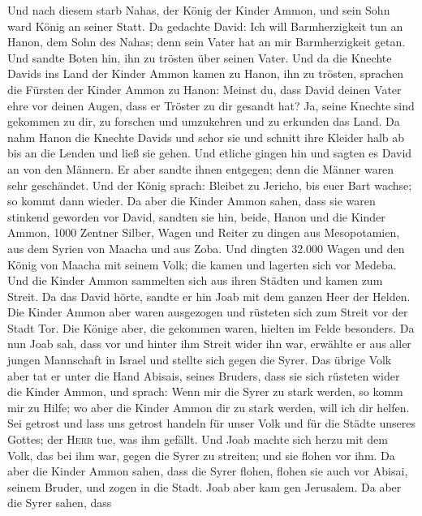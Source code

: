  Und nach diesem starb Nahas, der König der Kinder Ammon,
und sein Sohn ward König an seiner Statt.  Da gedachte
David: Ich will Barmherzigkeit tun an Hanon, dem Sohn des Nahas; denn
sein Vater hat an mir Barmherzigkeit getan. Und sandte Boten hin, ihn zu
trösten über seinen Vater. Und da die Knechte Davids ins Land der Kinder
Ammon kamen zu Hanon, ihn zu trösten,  sprachen die
Fürsten der Kinder Ammon zu Hanon: Meinst du, dass David deinen Vater
ehre vor deinen Augen, dass er Tröster zu dir gesandt hat? Ja, seine
Knechte sind gekommen zu dir, zu forschen und umzukehren und zu erkunden
das Land.  Da nahm Hanon die Knechte Davids und schor sie
und schnitt ihre Kleider halb ab bis an die Lenden und ließ sie gehen.
 Und etliche gingen hin und sagten es David an von den
Männern. Er aber sandte ihnen entgegen; denn die Männer waren sehr
geschändet. Und der König sprach: Bleibet zu Jericho, bis euer Bart
wachse; so kommt dann wieder.  Da aber die Kinder Ammon
sahen, dass sie waren stinkend geworden vor David, sandten sie hin,
beide, Hanon und die Kinder Ammon, 1000 Zentner Silber, Wagen und Reiter
zu dingen aus Mesopotamien, aus dem Syrien von Maacha und aus Zoba.
 Und dingten 32.000 Wagen und den König von Maacha mit
seinem Volk; die kamen und lagerten sich vor Medeba. Und die Kinder
Ammon sammelten sich aus ihren Städten und kamen zum Streit.
 Da das David hörte, sandte er hin Joab mit dem ganzen
Heer der Helden.  Die Kinder Ammon aber waren ausgezogen
und rüsteten sich zum Streit vor der Stadt Tor. Die Könige aber, die
gekommen waren, hielten im Felde besonders.  Da nun Joab
sah, dass vor und hinter ihm Streit wider ihn war, erwählte er aus aller
jungen Mannschaft in Israel und stellte sich gegen die Syrer.
 Das übrige Volk aber tat er unter die Hand Abisais,
seines Bruders, dass sie sich rüsteten wider die Kinder Ammon,
 und sprach: Wenn mir die Syrer zu stark werden, so komm
mir zu Hilfe; wo aber die Kinder Ammon dir zu stark werden, will ich dir
helfen.  Sei getrost und lass uns getrost handeln für
unser Volk und für die Städte unseres Gottes; der \textsc{Herr} tue, was
ihm gefällt.  Und Joab machte sich herzu mit dem Volk,
das bei ihm war, gegen die Syrer zu streiten; und sie flohen vor ihm.
 Da aber die Kinder Ammon sahen, dass die Syrer flohen,
flohen sie auch vor Abisai, seinem Bruder, und zogen in die Stadt. Joab
aber kam gen Jerusalem.  Da aber die Syrer sahen, dass
